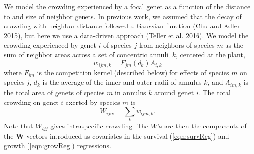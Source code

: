 \documentclass[11pt]{article}
\begin{document}
\begin{doublespacing}
We model the crowding experienced by a focal genet as a function of the distance to and size of neighbor genets. In previous work, we assumed that the decay of crowding with neighbor distance followed a Gaussian function (Chu and Adler 2015), but here we use a data-driven approach (Teller et al. 2016). We model the crowding experienced by genet $i$ of species $j$ from neighbors of species $m$ as the sum of neighbor areas across a set of concentric annuli, $k$, centered at the plant,
\begin{equation}
w_{ijm,k} = F_{jm}(d_{k})A_{i,k}     
\label{eqn:wik}
\end{equation}
where $F_{jm}$ is the competition kernel (described below) for effects of species $m$ on species $j$, 
$d_{k}$ is the average of the inner and outer radii of annulus $k$, 
and $A_{im,k}$ is the total area of genets of species $m$ in annulus $k$ around genet $i$. The total crowding on 
genet $i$ exerted by species $m$ is
\begin{equation}
W_{ijm}  =\sum_k {w_{ijm,k}} .
\label{eqn:wijm}
\end{equation} 
Note that $W_{ijj}$ gives intraspecific crowding. The $W$'s are then the components of the $\boldsymbol{W}$ vectors 
introduced as covariates in the survival (\ref{eqn:survReg}) and growth (\ref{eqn:growReg}) regressions.


\end{doublespacing}
\end{document}
